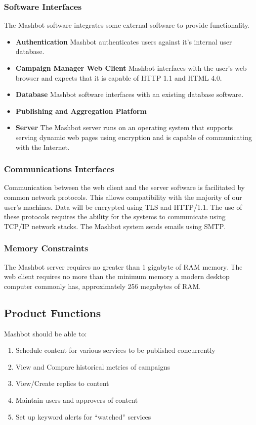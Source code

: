 \documentclass{report}
\begin{document}
\subsubsection{Software Interfaces} %
The Mashbot software integrates some external software to provide
functionality.
\begin{itemize}
\item \textbf{Authentication} Mashbot authenticates users against it's
  internal user database.
\item \textbf{Campaign Manager Web Client} Mashbot interfaces with the
  user’s web browser and expects that it is capable of HTTP 1.1 and
  HTML 4.0.
\item \textbf{Database} Mashbot software interfaces with an existing
  database software.
\item \textbf{Publishing and Aggregation Platform}
\item \textbf{Server} The Mashbot server runs on an operating system
  that supports serving dynamic web pages using encryption and is
  capable of communicating with the Internet.
\end{itemize}
\subsubsection{Communications Interfaces} %
Communication between the web client and the server software is
facilitated by common network protocols. This allows compatibility
with the majority of our user's machines.  Data will be encrypted
using TLS and HTTP/1.1. The use of these protocols requires the
ability for the systems to communicate using TCP/IP network stacks.
The Mashbot system sends emails using SMTP.

\subsubsection{Memory Constraints} %
The Mashbot server requires no greater than 1 gigabyte of RAM
memory. The web client requires no more than the minimum memory a
modern desktop computer commonly has, approximately 256 megabytes of
RAM.

\subsection{Product Functions} %
Mashbot should be able to:
\begin{enumerate}
\item Schedule content for various services to be published
  concurrently
\item View and Compare historical metrics of campaigns
\item View/Create replies to content
\item Maintain users and approvers of content
\item Set up keyword alerts for ``watched'' services
\end{enumerate}
\end{document}
